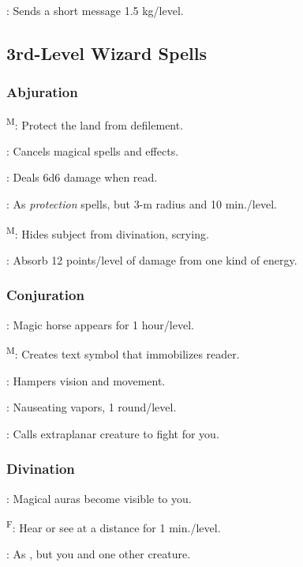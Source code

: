 	: Sends a short message 1.5 kg/level.



\subsection{3rd-Level Wizard Spells}

\subsubsection{Abjuration}
	\textsuperscript{M}: Protect the land from defilement. %

	: Cancels magical spells and effects.

	: Deals 6d6 damage when read.

	: As \emph{protection} spells, but 3-m radius and 10 min./level.

	\textsuperscript{M}: Hides subject from divination, scrying.

	: Absorb 12 points/level of damage from one kind of energy.

\subsubsection{Conjuration}
	: Magic horse appears for 1 hour/level.

	\textsuperscript{M}: Creates text symbol that immobilizes reader.

	: Hampers vision and movement.

	: Nauseating vapors, 1 round/level.

	: Calls extraplanar creature to fight for you.

\subsubsection{Divination}
	: Magical auras become visible to you.

	\textsuperscript{F}: Hear or see at a distance for 1 min./level.

	: As , but you and one other creature.

